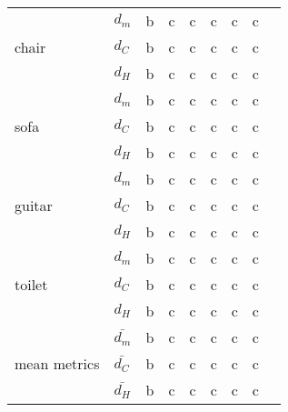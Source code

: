 \begin{center}
\begin{tabular}{| l | p{1.1cm} | p{0.8cm} | p{0.8cm} | p{0.8cm} | p{0.8cm} | p{0.9cm} | p{0.9cm} | p{0.9cm} |}
        \hline
        \multirow{3}{*}{chair}&$d_m$&b&c&c&c&c&c&\\
        &$d_C$&b&c&c&c&c&c&\\
        &$d_H$&b&c&c&c&c&c&\\
        \hline
        \multirow{3}{*}{sofa}&$d_m$&b&c&c&c&c&c&\\
        &$d_C$&b&c&c&c&c&c&\\
        &$d_H$&b&c&c&c&c&c&\\
        \hline
        \multirow{3}{*}{guitar}&$d_m$&b&c&c&c&c&c&\\
        &$d_C$&b&c&c&c&c&c&\\
        &$d_H$&b&c&c&c&c&c&\\
        \hline
        \multirow{3}{*}{toilet}&$d_m$&b&c&c&c&c&c&\\
        &$d_C$&b&c&c&c&c&c&\\
        &$d_H$&b&c&c&c&c&c&\\
        \hline\hline
        \multirow{3}{*}{mean metrics}&$\bar{d_m}$&b&c&c&c&c&c&\\
        &$\bar{d_C}$&b&c&c&c&c&c&\\
        &$\bar{d_H}$&b&c&c&c&c&c&\\
        \hline
    \end{tabular}
\end{center}

